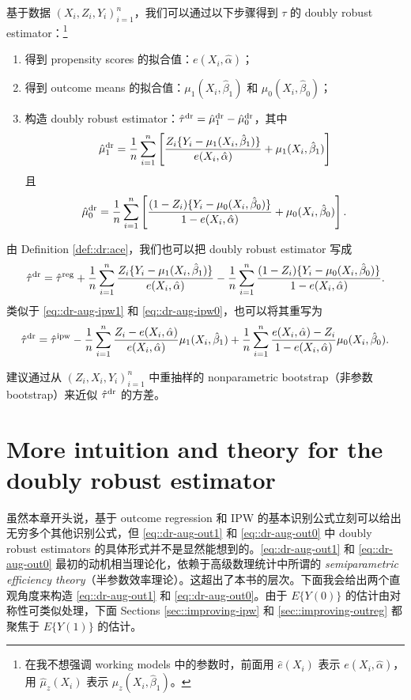 \begin{definition}
\label{def::dr:ace}
基于数据 $(X_i, Z_i, Y_i)_{i=1}^n$，我们可以通过以下步骤得到 $\tau$ 的 doubly robust estimator：\footnote{在我不想强调 working models 中的参数时，前面用 $\hat e(X_i)$ 表示 $e(X_i, \hat{\alpha})$，用 $ \hat \mu_z(X_i) $ 表示 $ \mu_z(X_i, \hat{\beta}_1) $。}
\begin{enumerate}
[(1)]
\item
得到 propensity scores 的拟合值：$e(X_i, \hat{\alpha})$；
\item
得到 outcome means 的拟合值：$ \mu_1(X_i, \hat{\beta}_1) $ 和 $ \mu_0(X_i, \hat{\beta}_0) $；
\item
构造 doubly robust estimator：$\hat{\tau}^\textup{dr} = \hat{\mu}_1^\textup{dr}  - \hat{\mu}_0^\textup{dr}$，其中
$$
 \hat{\mu}_1^\textup{dr}  = \frac{1}{n} \sum_{i=1}^n \left[ \frac{Z_i\{ Y_i-\mu_1(X_i,\hat{\beta}_1) \}}{  e(X_i, \hat{\alpha}) }   + \mu_1(X_i, \hat{\beta}_1) \right]
$$
且
$$
 \hat{\mu}_0^\textup{dr}  = \frac{1}{n} \sum_{i=1}^n \left[  \frac{(1-Z_i)\{ Y_i-\mu_0(X_i, \hat{\beta}_0) \}}{  1-e(X_i,\hat{\alpha}) }   + \mu_0(X_i, \hat{\beta}_0)       \right] . 
$$
\end{enumerate}
\end{definition}

由 Definition \ref{def::dr:ace}，我们也可以把 doubly robust estimator 写成
$$
\hat{\tau}^\textup{dr} =\hat{\tau}^\textup{reg}  + 
\frac{1}{n} \sum_{i=1}^n  \frac{Z_i\{ Y_i-\mu_1(X_i,\hat{\beta}_1) \}}{  e(X_i, \hat{\alpha}) } 
-  \frac{1}{n} \sum_{i=1}^n   \frac{(1-Z_i)\{ Y_i-\mu_0(X_i, \hat{\beta}_0) \}}{  1-e(X_i,\hat{\alpha}) }  . 
$$ 
类似于 \eqref{eq::dr-aug-ipw1} 和 \eqref{eq::dr-aug-ipw0}，也可以将其重写为
$$
\hat{\tau}^\textup{dr} = \hat{\tau}^\textup{ipw}  
  - \frac{1}{n} \sum_{i=1}^n    \frac{  Z_i -  e(X_i, \hat\alpha)  }{ e(X_i, \hat\alpha) } \mu_1(X_i, \hat\beta_1)
  + \frac{1}{n} \sum_{i=1}^n    \frac{ e(X_i, \hat\alpha)-Z_i  }{1- e(X_i,\hat \alpha)} \mu_0(X_i, \hat\beta_0) .
$$ 

 
\citet{funk2011doubly} 建议通过从 $(Z_i, X_i, Y_i)_{i=1}^n$ 中重抽样的 nonparametric bootstrap（非参数 bootstrap）来近似 $\hat{\tau}^\textup{dr}$ 的方差。
 

\section{More intuition and theory for the doubly robust estimator}

虽然本章开头说，基于 outcome regression 和 IPW 的基本识别公式立刻可以给出无穷多个其他识别公式，但 \eqref{eq::dr-aug-out1} 和 \eqref{eq::dr-aug-out0} 中 doubly robust estimators 的具体形式并不是显然能想到的。\eqref{eq::dr-aug-out1} 和 \eqref{eq::dr-aug-out0} 最初的动机相当理论化，依赖于高级数理统计中所谓的 {\it semiparametric efficiency theory}（半参数效率理论）\citep{bickel1993efficient}。这超出了本书的层次。下面我会给出两个直观角度来构造 \eqref{eq::dr-aug-out1} 和 \eqref{eq::dr-aug-out0}。由于 $E\{ Y(0) \}$ 的估计由对称性可类似处理，下面 Sections \ref{sec::improving-ipw} 和 \ref{sec::improving-outreg} 都聚焦于 $E\{ Y(1) \}$ 的估计。



